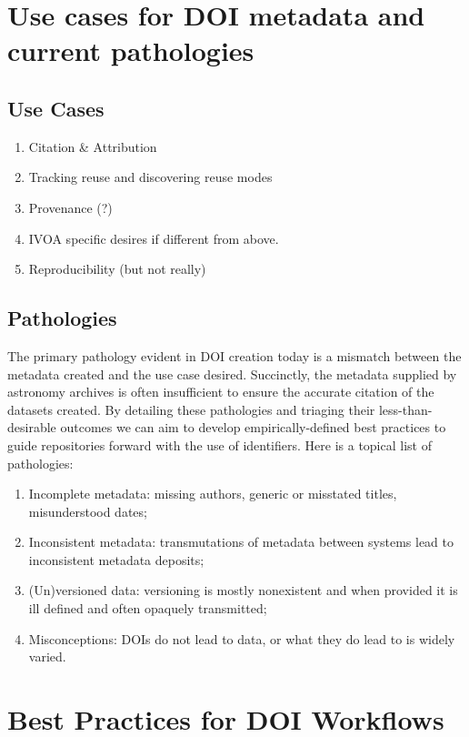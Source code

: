\documentclass[11pt,a4paper]{ivoa}
\begin{document}
\section{Use cases for DOI metadata and current pathologies}

\subsection{Use Cases}
\begin{enumerate}
\item Citation \& Attribution
\item Tracking reuse and discovering reuse modes
\item Provenance (?)
\item IVOA specific desires if different from above.
\item Reproducibility (but not really)
\end{enumerate}


\subsection{Pathologies}
The primary pathology evident in DOI creation today is a mismatch between the metadata created and the use case desired. 
Succinctly, the metadata supplied by astronomy archives is often insufficient to ensure the accurate citation of the datasets created.
By detailing these pathologies and triaging their less-than-desirable outcomes we can aim to develop empirically-defined best practices to guide repositories forward with the use of identifiers.
Here is a topical list of pathologies:

\begin{enumerate}
\item Incomplete metadata: missing authors, generic or misstated titles, misunderstood dates;
\item Inconsistent metadata: transmutations of metadata between systems lead to inconsistent metadata deposits;
\item (Un)versioned data: versioning is mostly nonexistent and when provided it is ill defined and often opaquely transmitted;
\item Misconceptions: DOIs do not lead to data, or what they do lead to is widely varied.
\end{enumerate}


\section{Best Practices for DOI Workflows}
\end{document}

